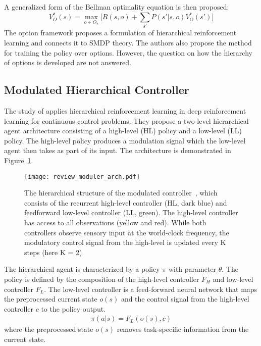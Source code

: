A generalized form of the Bellman optimality equation is then proposed:
\begin{equation}
    V_O^*(s) = \max_{o \in O_s} \big[ R(s,o)+\sum_{s'}P(s' \lvert s,o) V_O^*(s') \big]
\end{equation}
The option framework proposes a formulation of hierarchical reinforcement learning and connects it to SMDP theory. The authors also propose the method for training the policy over options. However, the question on how the hierarchy of options is developed are not answered.

\subsection{Modulated Hierarchical Controller}
The study of \cite{heess2016learning} applies hierarchical reinforcement learning in deep reinforcement learning for continuous control problems. They propose a two-level hierarchical agent architecture consisting of a high-level (HL) policy and a low-level (LL) policy. The high-level policy produces a modulation signal which the low-level agent then takes as part of its input. The architecture is demonstrated in Figure~\ref{review_moduler_arch}.
\begin{figure}[h]
	\texttt{[image: review\_moduler\_arch.pdf]}
	\centering
	\caption{The hierarchical structure of the modulated controller~\cite{heess2016learning}, which consists
		of the recurrent high-level controller (HL, dark blue) and
		feedforward low-level controller (LL, green).  The
		high-level controller has access to all observations (yellow and red). While both controllers observe sensory
		input at the world-clock frequency, the modulatory control signal from the high-level is updated every K
		steps (here K = 2)}\label{review_moduler_arch}
\end{figure}
The hierarchical agent is characterized by a policy $\pi$ with parameter $\theta$. The policy is defined by the composition of the high-level controller $F_H$ and low-level controller $F_L$. The low-level controller is a feed-forward neural network that maps the preprocessed current state $o(s)$ and the control signal from the high-level controller $c$ to the policy output.
\begin{align}
\pi (a| s) = F_L(o(s),c)
\end{align}
where the preprocessed state $o(s)$ removes task-specific information from the current state.
